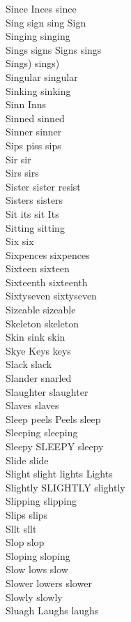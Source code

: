 Since Inces since\\
Sing sign sing Sign\\
Singing singing\\
Sings signs Signs sings\\
Sings) sings)\\
Singular singular\\
Sinking sinking\\
Sinn Inns\\
Sinned sinned\\
Sinner sinner\\
Sips piss sips\\
Sir sir\\
Sirs sirs\\
Sister sister resist\\
Sisters sisters\\
Sit its sit Its\\
Sitting sitting\\
Six six\\
Sixpences sixpences\\
Sixteen sixteen\\
Sixteenth sixteenth\\
Sixtyseven sixtyseven\\
Sizeable sizeable\\
Skeleton skeleton\\
Skin sink skin\\
Skye Keys keys\\
Slack slack\\
Slander snarled\\
Slaughter slaughter\\
Slaves slaves\\
Sleep peels Peels sleep\\
Sleeping sleeping\\
Sleepy SLEEPY sleepy\\
Slide slide\\
Slight slight lights Lights\\
Slightly SLIGHTLY slightly\\
Slipping slipping\\
Slips slips\\
Sllt sllt\\
Slop slop\\
Sloping sloping\\
Slow lows slow\\
Slower lowers slower\\
Slowly slowly\\
Sluagh Laughs laughs\\
